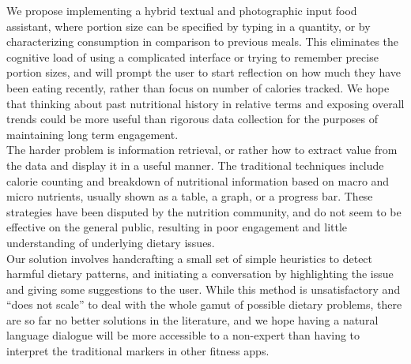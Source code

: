 We propose implementing a hybrid textual and photographic input food assistant, where portion size can be specified by typing in a quantity, or by characterizing consumption in comparison to previous meals. This eliminates the cognitive load of using a complicated interface or trying to remember precise portion sizes, and will prompt the user to start reflection on how much they have been eating recently, rather than focus on number of calories tracked. We hope that thinking about past nutritional history in relative terms and exposing overall trends could be more useful than rigorous data collection for the purposes of maintaining long term engagement. \\
The harder problem is information retrieval, or rather how to extract value from the data and display it in a useful manner. The traditional techniques include calorie counting and breakdown of nutritional information based on macro and micro nutrients, usually shown as a table, a graph, or a progress bar. These strategies have been disputed by the nutrition community, and do not seem to be effective on the general public, resulting in poor engagement and little understanding of underlying dietary issues. \\
Our solution involves handcrafting a small set of simple heuristics to detect harmful dietary patterns, and initiating a conversation by highlighting the issue and giving some suggestions to the user. While this method is unsatisfactory and ``does not scale'' to deal with the whole gamut of possible dietary problems, there are so far no better solutions in the literature, and we hope having a natural language dialogue will be more accessible to a non-expert than having to interpret the traditional markers in other fitness apps. \\

